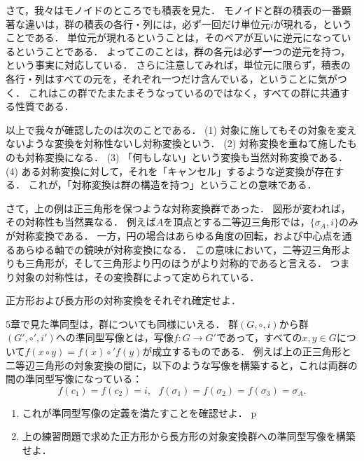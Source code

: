 \documentclass[11pt,a4paper]{jsarticle}
\begin{document}
さて，我々はモノイドのところでも積表を見た．
モノイドと群の積表の一番顕著な違いは，群の積表の各行・列には，必ず一回だけ単位元$i$が現れる，ということである．
単位元が現れるということは，そのペアが互いに逆元になっているということである．
よってこのことは，群の各元は必ず一つの逆元を持つ，という事実に対応している．
さらに注意してみれば，単位元に限らず，積表の各行・列はすべての元を，それぞれ一つだけ含んでいる，ということに気がつく．
これはこの群でたまたまそうなっているのではなく，すべての群に共通する性質である．

以上で我々が確認したのは次のことである．
(1) 対象に施してもその対象を変えないような変換を対称性ないし対称変換という．
(2) 対称変換を重ねて施したものも対称変換になる．
(3) 「何もしない」という変換も当然対称変換である．
(4) ある対称変換に対して，それを「キャンセル」するような逆変換が存在する．
これが，「対称変換は群の構造を持つ」ということの意味である．

さて，上の例は正三角形を保つような対称変換群であった．
図形が変われば，その対称性も当然異なる．
例えば$A$を頂点とする二等辺三角形では，$\{ \sigma_A, i\}$のみが対称変換である．
一方，円の場合はあらゆる角度の回転，および中心点を通るあらゆる軸での鏡映が対称変換になる．
この意味において，二等辺三角形よりも三角形が，そして三角形より円のほうがより対称的であると言える．
つまり対象の対称性は，その変換群によって定められている．

\begin{exercise}
    正方形および長方形の対称変換をそれぞれ確定せよ．
\end{exercise}

\begin{exercise}
    5章で見た準同型は，群についても同様にいえる．
    群$(G, \circ, i)$から群$(G', \circ', i')$への準同型写像とは，写像$f:G \to G'$であって，すべての$x, y \in G$について$f(x\circ y) = f(x) \circ' f(y)$が成立するものである．
    例えば上の正三角形と二等辺三角形の対象変換の間に，以下のような写像を構築すると，これは両群の間の準同型写像になっている：
    \[
    f(c_1)=f(c_2)=i, \ \ \ f(\sigma_1) = f(\sigma_2) = f(\sigma_3) = \sigma_A.    
    \]
    \begin{enumerate}
        \item これが準同型写像の定義を満たすことを確認せよ．
p        \item 上の練習問題で求めた正方形から長方形の対象変換群への準同型写像を構築せよ．
    \end{enumerate}
\end{exercise}
\end{document}
